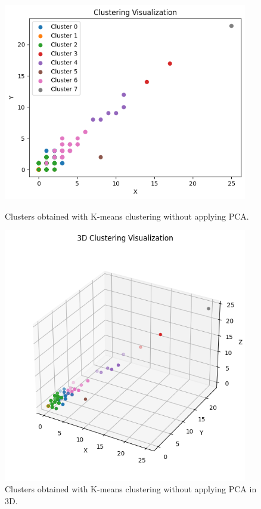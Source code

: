 \begin{figure}[H]
	\centering
	\begin{minipage}[t]{0.48\textwidth}
		\centering
		\includegraphics[width=0.95\textwidth]{../imgs/graphs/clustering/cluster_nopca.png}
		\caption{Clusters obtained with K-means clustering without applying PCA.}
		\label{fig:clusters_k9_no_PCA}
	\end{minipage}\hfill
	\begin{minipage}[t]{0.48\textwidth}
		\centering
		\includegraphics[width=0.95\textwidth]{../imgs/graphs/clustering/cluster_nopca_3d.png}
		\caption{Clusters obtained with K-means clustering without applying PCA in 3D.}
		\label{fig:clusters_k9_no_PCA_3d}
	\end{minipage}
\end{figure}

